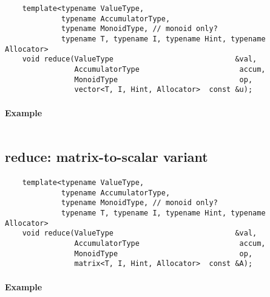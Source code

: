 \begin{verbatim}
    template<typename ValueType,
             typename AccumulatorType,
             typename MonoidType, // monoid only?
             typename T, typename I, typename Hint, typename Allocator>
    void reduce(ValueType                            &val,
                AccumulatorType                       accum,
                MonoidType                            op,
                vector<T, I, Hint, Allocator>  const &u);
\end{verbatim}


\paragraph{Example}

\begin{verbatim}

\end{verbatim}


\subsection{{\sf reduce}: matrix-to-scalar variant}


\paragraph{\syntax}

\begin{verbatim}
    template<typename ValueType,
             typename AccumulatorType,
             typename MonoidType, // monoid only?
             typename T, typename I, typename Hint, typename Allocator>
    void reduce(ValueType                            &val,
                AccumulatorType                       accum,
                MonoidType                            op,
                matrix<T, I, Hint, Allocator>  const &A);
\end{verbatim}


\paragraph{Example}

\begin{verbatim}

\end{verbatim}


